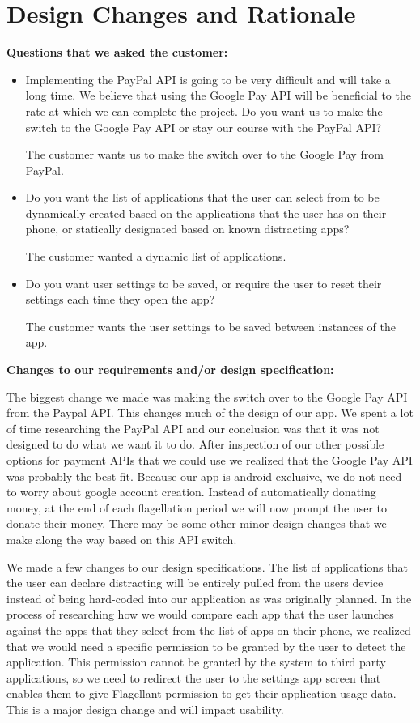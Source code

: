 \documentclass[a4paper]{article}
\begin{document}
\section{Design Changes and Rationale}
\textbf{Questions that we asked the customer:}
\begin{itemize}
\item Implementing the PayPal API is going to be very difficult and will take a long time. We believe that using the Google Pay API will be beneficial to the rate at which we can complete the project. Do you want us to make the switch to the Google Pay API or stay our course with the PayPal API?

The customer wants us to make the switch over to the Google Pay from PayPal.


\item Do you want the list of applications that the user can select from to be dynamically created based on the applications that the user has on their phone, or statically designated based on known distracting apps?

The customer wanted a dynamic list of applications.


\item Do you want user settings to be saved, or require the user to reset their settings each time they open the app?

The customer wants the user settings to be saved between instances of the app.
\end{itemize}
\textbf{Changes to our requirements and/or design specification:}

The biggest change we made was making the switch over to the Google Pay API from the Paypal API. This changes much of the design of our app. We spent a lot of time researching the PayPal API and our conclusion was that it was not designed to do what we want it to do. After inspection of our other possible options for payment APIs that we could use we realized that the Google Pay API was probably the best fit. Because our app is android exclusive, we do not need to worry about google account creation. Instead of automatically donating money, at the end of each flagellation period we will now prompt the user to donate their money. There may be some other minor design changes that we make along the way based on this API switch.
	
    We made a few changes to our design specifications. The list of applications that the user can declare distracting will be entirely pulled from the users device instead of being hard-coded into our application as was originally planned. In the process of researching how we would compare each app that the user launches against the apps that they select from the list of apps on their phone, we realized that we would need a specific permission to be granted by the user to detect the application. This permission cannot be granted by the system to third party applications, so we need to redirect the user to the settings app screen that enables them to give Flagellant permission to get their application usage data. This is a major design change and will impact usability.
	
\end{document}
